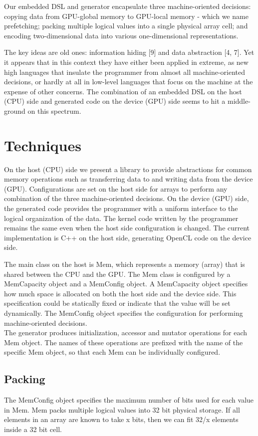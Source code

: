\documentclass[conference]{IEEEtran}
\begin{document}
Our embedded DSL and generator encapsulate three machine-oriented decisions: copying data from GPU-global memory to GPU-local memory - which we name prefetching; packing multiple logical values into a single physical array cell; and encoding two-dimensional data into various one-dimensional representations.

The key ideas are old ones: information hiding [9] and data abstraction [4, 7]. Yet it appears that in this context they have either been applied in extreme, as new high languages that insulate the programmer from almost all machine-oriented decisions, or hardly at all in low-level languages that focus on the machine at the expense of other concerns. The combination of an embedded DSL on the host (CPU) side and generated code on the device (GPU) side seems to hit a middle-ground on this spectrum.

\section{Techniques}
On the host (CPU) side we present a library to provide abstractions for common memory operations such as transferring data to and writing data from the device (GPU). Configurations are set on the host side for arrays to perform any combination of the three machine-oriented decisions. On the device (GPU) side, the generated code provides the programmer with a uniform interface to the logical organization of the data. The kernel code written by the programmer remains the same even when the host side configuration is changed. The current implementation is C++ on the host side, generating OpenCL code on the device side.

The main class on the host is Mem, which represents a memory (array) that is shared between the CPU and the GPU. The Mem class is configured by a MemCapacity object and a MemConfig object. A MemCapacity object specifies how much space is allocated on both the host side and the device side. This specification could be statically fixed or indicate that the value will be set dynamically. The MemConfig object specifies the configuration for performing machine-oriented decisions. \\
The generator produces initialization, accessor and mutator operations for each Mem object. The names of these operations are prefixed with the name of the specific Mem object, so that each Mem can be individually configured. 


\subsection{Packing}
The MemConfig object specifies the maximum number of bits used for each value in Mem. Mem packs multiple logical values into 32 bit physical storage. If all elements in an array are known to take x bits, then we can fit 32/x elements inside a 32 bit cell. 
\end{document}
